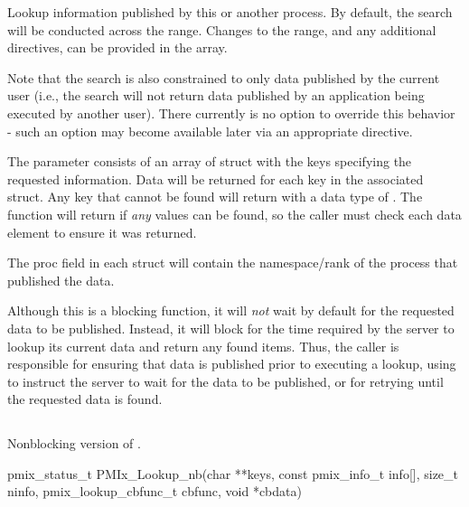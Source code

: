 \descr

Lookup information published by this or another process.
By default, the search will be conducted across the  range.
Changes to the range, and any additional directives, can be provided in the  array.

Note that the search is also constrained to only data published by the current user (i.e., the search will not return data published by an application being executed by another user).
There currently is no option to override this behavior - such an option may become available later via an appropriate  directive.

The  parameter consists of an array of  struct with the keys specifying the requested information.
Data will be returned for each key in the associated  struct.
Any key that cannot be found will return with a data type of .
The function will return  if \emph{any} values can be found, so the caller must check each data element to ensure it was returned.

The proc field in each  struct will contain the namespace/rank of the process that published the data.

\adviceuserstart
Although this is a blocking function, it will \emph{not} wait by default for the requested data to be published.
Instead, it will block for the time required by the server to lookup its current data and return any found items.
Thus, the caller is responsible for ensuring that data is published prior to executing a lookup, using  to instruct the server to wait for the data to be published, or for retrying until the requested data is found.
\adviceuserend

\subsection{}

\summary

Nonblocking version of .

\format

\cspecificstart
\begin{codepar}
pmix_status_t
PMIx_Lookup_nb(char **keys,
               const pmix_info_t info[], size_t ninfo,
               pmix_lookup_cbfunc_t cbfunc, void *cbdata)
\end{codepar}
\cspecificend

